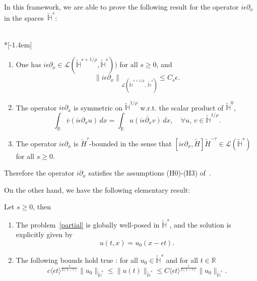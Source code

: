 \documentclass[AHL,Unicode,published]{cedram}
\newcommand{\R}{\mathbb{R}}
\newcommand{\HH}{\mathbb{H}}
\newcommand{\clL}{\mathcal{L}}
\newcommand*\eps{\epsilon}
\newcommand{\ov}{\overline}
\newcommand{\wt}{\widetilde}
\newcommand{\<}{\langle}
\renewcommand{\>}{\rangle}
\newcommand*{\romanenumi}{\renewcommand*{\theenumi}{\roman{enumi}}}
\let\oldforall\forall
\renewcommand*{\forall}{\mathrel{\oldforall}}
\newcommand{\R}{\mathbb{R}}
\begin{document}
In this framework, we are able to prove the following result for the operator $i \eps \partial_x$ in the spaces~$\widetilde{\HH}^{s} $:



\begin{lemm}\label{lem-partial}\ \\*[-1.4em]
\begin{enumerate}\romanenumi
\item\label{lemm.A.1.1} One has $i \eps \partial_x \in \clL(\widetilde{\HH}^{s+1/\rho}, \widetilde{\HH}^{s}))$ for all $s \geq 0$, and
\[
\left\| i \eps\partial_x\right\|_{ \clL\left(\widetilde{\HH}^{s+1/\rho},\,\widetilde{\HH}^{s}\right)} \leq C_s \eps.
\]
\item\label{lemm.A.1.2} The operator $i \eps \partial_x$ is symmetric on $ \widetilde{\HH}^{1/\rho}$ w.r.t. the scalar product of $\widetilde{\HH}^{0}$,
\[
\int_{\R} \ov{v} \left(i\eps \partial_x u\right) \,dx= \int_{\R} u\ov{\left(i\eps \partial_x v\right)}\,dx, \quad \forall{u,\,v \in \widetilde{\HH}^{1/\rho}}.
\]
\item\label{lemm.A.1.3} The operator $i \eps \partial_x$ is $\wt{H}^{\tau}$-bounded in the sense that $ [i \eps \partial_x, \wt{H}] \wt{H}^{-\tau} \in \clL(\widetilde{\HH}^{s})$ for all $s \geq 0$.
\end{enumerate}
\end{lemm}

Therefore the operator $i \partial_x$ satisfies the assumptions (H0)-(H3) of~\cite{MasRo}.


On the other hand, we have the following elementary result:

\begin{prop}\label{thm-abs2}
Let $s\geq 0$, then
\begin{enumerate}\romanenumi
\item\label{prop.A.2.1} The problem~\eqref{partial} is globally well-posed in $\widetilde{\HH}^{s}$, and the solution is explicitly given by
\[
u(t,x)=u_0(x-\eps t).
\]
\item\label{prop.A.2.2} The following bounds hold true : for all $u_0\in \widetilde{\HH}^{s}$ and for all $t\in \R$
\begin{equation}\label{bound.prop}
c \<\eps t\>^{\frac s{2(1-\tau)}} \| u_0\|_{\widetilde{\HH}^{s}} \leq
\| u(t)\|_{\widetilde{\HH}^{s}}\leq C \<\eps t\>^{\frac s{2(1-\tau)}}\| u_0\|_{\widetilde{\HH}^{s}}.
\end{equation}
\end{enumerate}
\end{prop}
\end{document}
